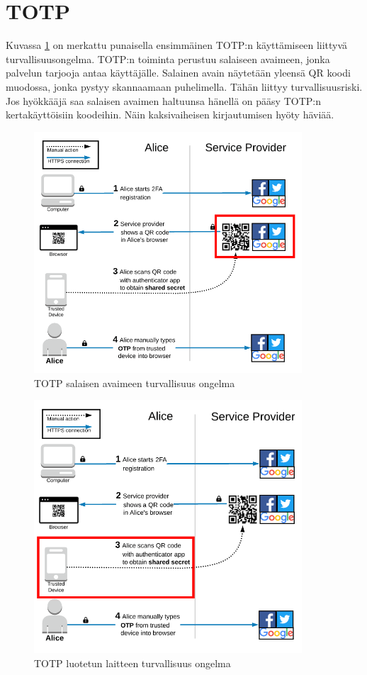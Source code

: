 \section{TOTP}



Kuvassa \ref{fig:TOTP_service_provider} on merkattu punaisella ensimmäinen TOTP:n käyttämiseen liittyvä turvallisuusongelma. TOTP:n toiminta perustuu salaiseen avaimeen, jonka palvelun tarjooja antaa käyttäjälle. Salainen avain näytetään yleensä QR koodi muodossa, jonka pystyy skannaamaan puhelimella. Tähän liittyy turvallisuusriski. Jos hyökkääjä saa salaisen avaimen haltuunsa hänellä on pääsy TOTP:n kertakäyttöisiin koodeihin. Näin kaksivaiheisen kirjautumisen hyöty häviää. 

\begin{figure}[ht]
    \centering
    \includegraphics[width=10cm]{template/figures/TOTP service-provider-compromise.png}
    \caption{TOTP salaisen avaimeen turvallisuus ongelma \citep{TOTP}}
    \label{fig:TOTP_service_provider}
\end{figure}

\begin{figure}
    \centering
    \includegraphics[width=10cm]{template/figures/TOTP trusted-device-compromise.png}
    \caption{TOTP luotetun laitteen turvallisuus ongelma \citep{TOTP}}
    \label{fig:TOTP_device}
\end{figure}

